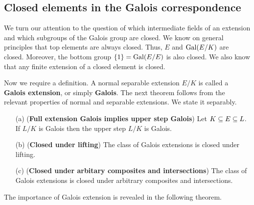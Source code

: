 \subsection{Closed elements in the Galois correspondence}
We turn our attention to the question of which intermediate fields of an extension and which subgroups of the Galois group are closed. We know on general principles that top elements are always closed. Thus, $E$ and $\mathrm{Gal}(E/K)$ are closed. Moreover, the bottom group $\{1\}=\mathrm{Gal}(E/E)$ is also closed. We also know that any finite extension of a closed element is closed.\par
Now we require a definition. A normal separable extension $E/K$ is called a \textbf{Galois extension}, or simply \textbf{Galois}. The next theorem follows from the relevant properties of normal and separable extensions. We state it separably.
\begin{proposition}\label{Galois extension prop}
\mbox{}
\begin{itemize}
\item[(a)] (\textbf{Full extension Galois implies upper step Galois}) Let $K\subseteq E\subseteq L$. If $L/K$ is Galois then the upper step $L/K$ is Galois.
\item[(b)] (\textbf{Closed under lifting}) The class of Galois extensions is closed under lifting.
\item[(c)] (\textbf{Closed under arbitary composites and intersections}) The class of Galois extensions is closed under arbitrary composites and intersections.
\end{itemize}
\end{proposition}
The importance of Galois extension is revealed in the following theorem.
